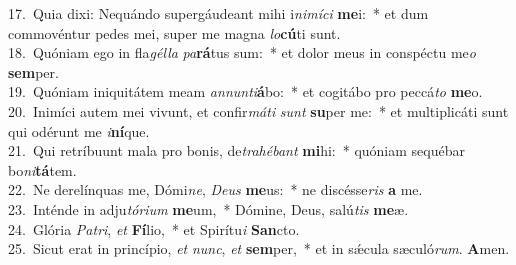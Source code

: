 {17.~}Quia dixi: Nequándo supergáudeant mihi i\textit{ni}\textit{mí}\textit{ci} \textbf{me}i:~* et dum commovéntur pedes mei, super me magna \textit{lo}\textbf{cú}ti sunt.\\
{18.~}Quóniam ego in fla\textit{gél}\textit{la} \textit{pa}\textbf{rá}tus sum:~* et dolor meus in conspéctu me\textit{o} \textbf{sem}per.\\
{19.~}Quóniam iniquitátem meam \textit{an}\textit{nun}\textit{ti}\textbf{á}bo:~* et cogitábo pro peccá\textit{to} \textbf{me}o.\\
{20.~}Inimíci autem mei vivunt, et confir\textit{má}\textit{ti} \textit{sunt} \textbf{su}per me:~* et multiplicáti sunt qui odérunt me \textit{i}\textbf{ní}que.\\
{21.~}Qui retríbuunt mala pro bonis, de\textit{tra}\textit{hé}\textit{bant} \textbf{mi}hi:~* quóniam sequébar bo\textit{ni}\textbf{tá}tem.\\
{22.~}Ne derelínquas me, Dómi\textit{ne}, \textit{De}\textit{us} \textbf{me}us:~* ne discésse\textit{ris} \textbf{a} me.\\
{23.~}Inténde in adju\textit{tó}\textit{ri}\textit{um} \textbf{me}um,~* Dómine, Deus, salú\textit{tis} \textbf{me}æ.\\
{24.~}Glória \textit{Pa}\textit{tri}, \textit{et} \textbf{Fí}lio,~* et Spirítu\textit{i} \textbf{San}cto.\\
{25.~}Sicut erat in princípio, \textit{et} \textit{nunc}, \textit{et} \textbf{sem}per,~* et in sǽcula sæculó\textit{rum}. \textbf{A}men.\\
